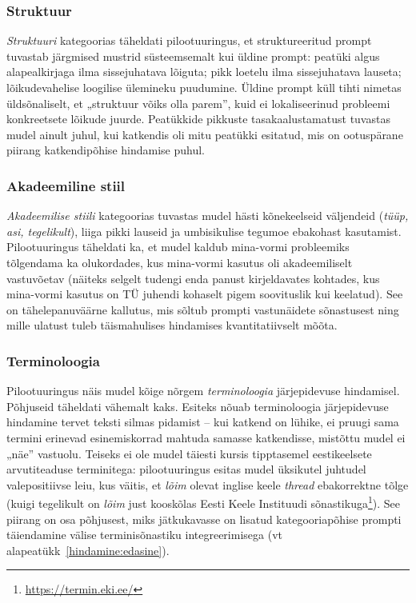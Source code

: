 \subsubsection{Struktuur}

\emph{Struktuuri} kategoorias täheldati pilootuuringus, et struktureeritud prompt tuvastab järgmised mustrid süsteemsemalt kui üldine prompt: peatüki algus alapealkirjaga ilma sissejuhatava lõiguta; pikk loetelu ilma sissejuhatava lauseta; lõikudevahelise loogilise ülemineku puudumine. Üldine prompt küll tihti nimetas üldsõnaliselt, et „struktuur võiks olla parem”, kuid ei lokaliseerinud probleemi konkreetsete lõikude juurde. Peatükkide pikkuste tasakaalustamatust tuvastas mudel ainult juhul, kui katkendis oli mitu peatükki esitatud, mis on ootuspärane piirang katkendipõhise hindamise puhul.

\subsubsection{Akadeemiline stiil}

\emph{Akadeemilise stiili} kategoorias tuvastas mudel hästi kõnekeelseid väljendeid (\emph{tüüp, asi, tegelikult}), liiga pikki lauseid ja umbisikulise tegumoe ebakohast kasutamist. Pilootuuringus täheldati ka, et mudel kaldub mina-vormi probleemiks tõlgendama ka olukordades, kus mina-vormi kasutus oli akadeemiliselt vastuvõetav (näiteks selgelt tudengi enda panust kirjeldavates kohtades, kus mina-vormi kasutus on TÜ juhendi kohaselt pigem soovituslik kui keelatud). See on tähelepanuväärne kallutus, mis sõltub prompti vastunäidete sõnastusest ning mille ulatust tuleb täismahulises hindamises kvantitatiivselt mõõta.

\subsubsection{Terminoloogia}

Pilootuuringus näis mudel kõige nõrgem \emph{terminoloogia} järjepidevuse hindamisel. Põhjuseid täheldati vähemalt kaks. Esiteks nõuab terminoloogia järjepidevuse hindamine tervet teksti silmas pidamist -- kui katkend on lühike, ei pruugi sama termini erinevad esinemiskorrad mahtuda samasse katkendisse, mistõttu mudel ei „näe” vastuolu. Teiseks ei ole mudel täiesti kursis tipptasemel eestikeelsete arvutiteaduse terminitega: pilootuuringus esitas mudel üksikutel juhtudel valepositiivse leiu, kus väitis, et \emph{lõim} olevat inglise keele \emph{thread} ebakorrektne tõlge (kuigi tegelikult on \emph{lõim} just kooskõlas Eesti Keele Instituudi sõnastikuga\footnote{\url{https://termin.eki.ee/}}). See piirang on osa põhjusest, miks jätkukavasse on lisatud kategooriapõhise prompti täiendamine välise terminisõnastiku integreerimisega (vt alapeatükk~\ref{hindamine:edasine}).

